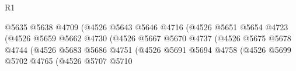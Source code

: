 \begin{lexlean}{R1}
\begin{coremodule}
                                                      @5635
                                                      @5638
                                                      @4709
                                                      (@4526
                                                        @5643
                                                        @5646
                                                        @4716
                                                        (@4526
                                                          @5651
                                                          @5654
                                                          @4723
                                                          (@4526
                                                            @5659
                                                            @5662
                                                            @4730
                                                            (@4526
                                                              @5667
                                                              @5670
                                                              @4737
                                                              (@4526
                                                                @5675
                                                                @5678
                                                                @4744
                                                                (@4526
                                                                  @5683
                                                                  @5686
                                                                  @4751
                                                                  (@4526
                                                                    @5691
                                                                    @5694
                                                                    @4758
                                                                    (@4526
                                                                      @5699
                                                                      @5702
                                                                      @4765
                                                                      (@4526
                                                                        @5707
                                                                        @5710

\end{coremodule}
\end{lexlean}
